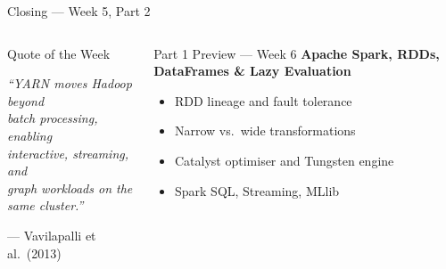 \documentclass[aspectratio=169,10pt]{beamer}
\begin{document}
\begin{frame}{Closing — Week 5, Part 2}
\begin{columns}[T]
      \begin{alertblock}{Quote of the Week}
        \begin{center}
        \large\itshape
        ``YARN moves Hadoop beyond\\
        batch processing, enabling\\
        interactive, streaming, and\\
        graph workloads on the same cluster.''
        \end{center}
        \begin{flushright}
        \small --- Vavilapalli et al.\ (2013)
        \end{flushright}
      \end{alertblock}
      \vspace{6pt}
      \begin{exampleblock}{Part 1 Preview — Week 6}
        \textbf{Apache Spark, RDDs, DataFrames \& Lazy Evaluation}\\[3pt]
        \begin{itemize}\setlength\itemsep{1pt}
          \item RDD lineage and fault tolerance
          \item Narrow vs.\ wide transformations
          \item Catalyst optimiser and Tungsten engine
          \item Spark SQL, Streaming, MLlib
        \end{itemize}
      \end{exampleblock}
  \end{columns}
\end{frame}

\end{document}
